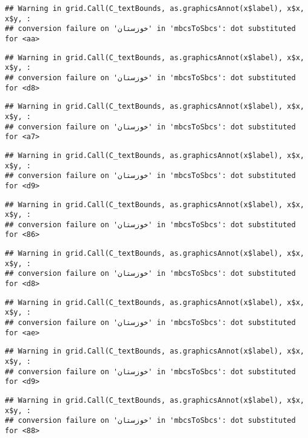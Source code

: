 \documentclass[
]{article}
\begin{document}
\begin{verbatim}
## Warning in grid.Call(C_textBounds, as.graphicsAnnot(x$label), x$x, x$y, :
## conversion failure on 'خوزستان' in 'mbcsToSbcs': dot substituted for <aa>
\end{verbatim}

\begin{verbatim}
## Warning in grid.Call(C_textBounds, as.graphicsAnnot(x$label), x$x, x$y, :
## conversion failure on 'خوزستان' in 'mbcsToSbcs': dot substituted for <d8>
\end{verbatim}

\begin{verbatim}
## Warning in grid.Call(C_textBounds, as.graphicsAnnot(x$label), x$x, x$y, :
## conversion failure on 'خوزستان' in 'mbcsToSbcs': dot substituted for <a7>
\end{verbatim}

\begin{verbatim}
## Warning in grid.Call(C_textBounds, as.graphicsAnnot(x$label), x$x, x$y, :
## conversion failure on 'خوزستان' in 'mbcsToSbcs': dot substituted for <d9>
\end{verbatim}

\begin{verbatim}
## Warning in grid.Call(C_textBounds, as.graphicsAnnot(x$label), x$x, x$y, :
## conversion failure on 'خوزستان' in 'mbcsToSbcs': dot substituted for <86>
\end{verbatim}

\begin{verbatim}
## Warning in grid.Call(C_textBounds, as.graphicsAnnot(x$label), x$x, x$y, :
## conversion failure on 'خوزستان' in 'mbcsToSbcs': dot substituted for <d8>
\end{verbatim}

\begin{verbatim}
## Warning in grid.Call(C_textBounds, as.graphicsAnnot(x$label), x$x, x$y, :
## conversion failure on 'خوزستان' in 'mbcsToSbcs': dot substituted for <ae>
\end{verbatim}

\begin{verbatim}
## Warning in grid.Call(C_textBounds, as.graphicsAnnot(x$label), x$x, x$y, :
## conversion failure on 'خوزستان' in 'mbcsToSbcs': dot substituted for <d9>
\end{verbatim}

\begin{verbatim}
## Warning in grid.Call(C_textBounds, as.graphicsAnnot(x$label), x$x, x$y, :
## conversion failure on 'خوزستان' in 'mbcsToSbcs': dot substituted for <88>
\end{verbatim}
\end{document}
